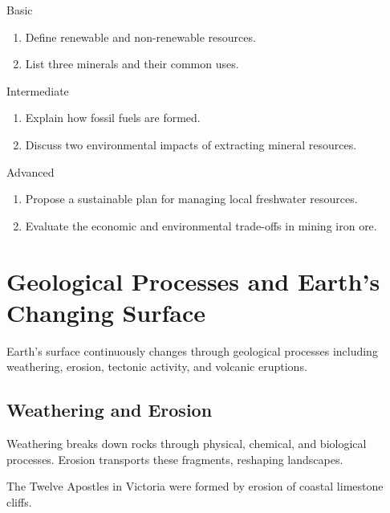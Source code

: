 \begin{tieredquestions}{Basic}
\begin{enumerate}
    \item Define renewable and non-renewable resources.
    \item List three minerals and their common uses.
\end{enumerate}
\end{tieredquestions}

\begin{tieredquestions}{Intermediate}
\begin{enumerate}
    \item Explain how fossil fuels are formed.
    \item Discuss two environmental impacts of extracting mineral resources.
\end{enumerate}
\end{tieredquestions}

\begin{tieredquestions}{Advanced}
\begin{enumerate}
    \item Propose a sustainable plan for managing local freshwater resources.
    \item Evaluate the economic and environmental trade-offs in mining iron ore.
\end{enumerate}
\end{tieredquestions}

\section{Geological Processes and Earth's Changing Surface}

Earth's surface continuously changes through geological processes including weathering, erosion, tectonic activity, and volcanic eruptions.

\subsection{Weathering and Erosion}

Weathering breaks down rocks through physical, chemical, and biological processes. Erosion transports these fragments, reshaping landscapes.


\begin{example}
The Twelve Apostles in Victoria were formed by erosion of coastal limestone cliffs.
\end{example}

